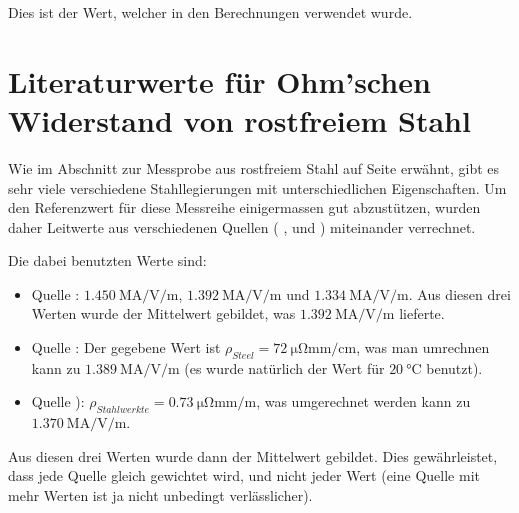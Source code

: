 Dies ist der Wert, welcher in den Berechnungen verwendet wurde.


\clearpage
\section[Widerstand rostfreier Stahl]{Literaturwerte f\"ur Ohm'schen Widerstand von rostfreiem Stahl}
\label{app:steel}

Wie    im    Abschnitt    zur    Messprobe   aus    rostfreiem    Stahl    auf
Seite    \pageref{sec:ausw:subsec:hohlz:subsubsec:steel}    erw\"ahnt,    gibt
es   sehr   viele    verschiedene   Stahllegierungen   mit   unterschiedlichen
Eigenschaften. Um  den   Referenzwert  f\"ur  diese   Messreihe  einigermassen
gut   abzust\"utzen, wurden   daher   Leitwerte   aus  verschiedenen   Quellen
(    \cite{ref:stainless:hypertextbook},   \cite{ref:stainless:aksteel}    und
\cite{ref:stainless:stahlwerke} ) miteinander verrechnet.

Die dabei benutzten Werte sind:
\begin{itemize}
    \item
        Quelle \cite{ref:stainless:hypertextbook}:
        $\SI{1.450}{\mega\ampere\per\volt\per\meter}$,
        $\SI{1.392}{\mega\ampere\per\volt\per\meter}$ und
        $\SI{1.334}{\mega\ampere\per\volt\per\meter}$.
        Aus diesen drei Werten wurde der Mittelwert gebildet, was
        $\SI{1.392}{\mega\ampere\per\volt\per\meter}$ lieferte.
    \item
        Quelle    \cite{ref:stainless:aksteel}: Der    gegebene    Wert    ist
        $\rho_{Steel} =  \SI{72}{\micro\ohm\milli\meter\per\centi\meter}$, was
        man  umrechnen  kann zu  $\SI{1.389}{\mega\ampere\per\volt\per\meter}$
        (es  wurde  nat\"urlich   der  Wert  f\"ur  $\SI{20}{\celsius}$
        benutzt).
    \item
        Quelle    \cite{ref:stainless:stahlwerke}):   $\rho_{Stahlwerkte}    =
        \SI{0.73}{\micro\ohm\milli\meter\per\meter}$,  was umgerechnet  werden
        kann zu $\SI{1.370}{\mega\ampere\per\volt\per\meter}$.
\end{itemize}

Aus   diesen   drei   Werten   wurde  dann   der   Mittelwert   gebildet. Dies
gew\"ahrleistet, dass jede Quelle gleich  gewichtet wird, und nicht jeder Wert
(eine Quelle mit mehr Werten ist ja nicht unbedingt verl\"asslicher).

